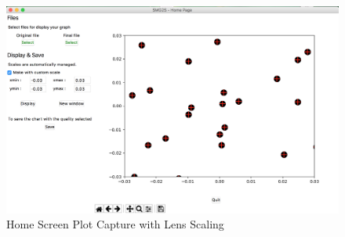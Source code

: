 \documentclass[a4paper, 10 pt]{report}
\begin{document}
\begin{figure}[htbp]
	\label{fig:Home Screen Plot Capture with lens scaling}
	\caption{Home Screen Plot Capture with Lens Scaling}
		\centering
	\includegraphics[width=12cm]{home_screen_custom.png}
\end{figure}


	\newpage
\end{document}
